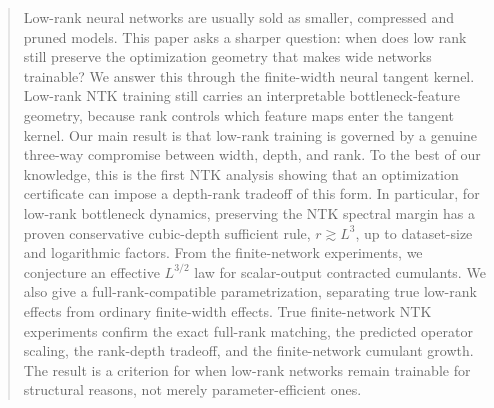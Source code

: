 \documentclass{article}
\begin{document}
\printAffiliationsAndNotice{}


\begin{abstract}
Low-rank neural networks are usually sold as smaller, compressed and pruned models. This paper asks a sharper question: when does low rank still preserve the optimization geometry that makes wide networks trainable? We answer this through the finite-width neural tangent kernel. Low-rank NTK training still carries an interpretable bottleneck-feature geometry, because rank controls which feature maps enter the tangent kernel. Our main result is that low-rank training is governed by a genuine three-way compromise between width, depth, and rank. To the best of our knowledge, this is the first NTK analysis showing that an optimization certificate can impose a depth-rank tradeoff of this form. In particular, for low-rank bottleneck dynamics, preserving the NTK spectral margin has a proven conservative cubic-depth sufficient rule, \(r \gtrsim L^{3}\), up to dataset-size and logarithmic factors. From the finite-network experiments, we conjecture an effective \(L^{3/2}\) law for scalar-output contracted cumulants. We also give a full-rank-compatible parametrization, separating true low-rank effects from ordinary finite-width effects. True finite-network NTK experiments confirm the exact full-rank matching, the predicted operator scaling, the rank-depth tradeoff, and the finite-network cumulant growth. The result is a criterion for when low-rank networks remain trainable for structural reasons, not merely parameter-efficient ones.
\end{abstract}
\end{document}
